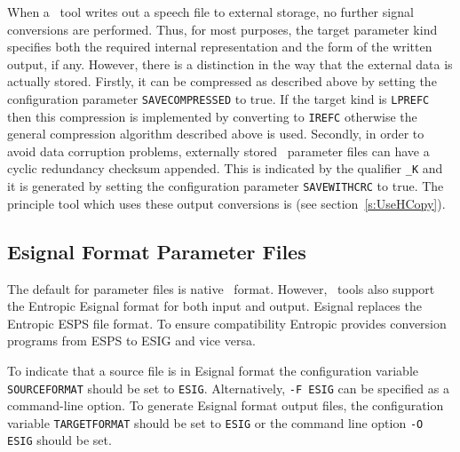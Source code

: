 When a \HTK\ tool writes out a speech file to external storage, no further
signal conversions are performed.  Thus, for most purposes, the target
parameter kind specifies both the required internal representation and the form
of the written output, if any.  However, there is a distinction in the way that
the external data is actually stored.  Firstly, it can be compressed as
described above by setting the configuration parameter \texttt{SAVECOMPRESSED}
to true.  If the target kind is \texttt{LPREFC} then this compression is
implemented by converting to \texttt{IREFC} otherwise the general compression
algorithm described above is used.  Secondly, in order to avoid data corruption
problems, externally stored \HTK\ parameter files can have a cyclic redundancy
checksum appended.  This is indicated by the qualifier
\texttt{\_K} and it is generated by setting
the configuration parameter \texttt{SAVEWITHCRC} to true.  The principle tool
which uses these output conversions is  (see
section~\ref{s:UseHCopy}).

\subsection{Esignal Format Parameter Files}

The default for parameter files is native \HTK\ format.  However, \HTK\ tools
also support the Entropic Esignal format for both input and output. Esignal
replaces the Entropic ESPS file format. To ensure compatibility Entropic
provides conversion programs from ESPS to ESIG and vice versa.

To indicate that a source file is in Esignal format the configuration
variable  \texttt{SOURCEFORMAT}
should be set to \texttt{ESIG}.  Alternatively, 
\texttt{-F ESIG} can be specified
as a command-line option.  
To generate Esignal format output files, the configuration variable
\texttt{TARGETFORMAT} should be set to \texttt{ESIG} or the command line option
\texttt{-O ESIG} should be set.

